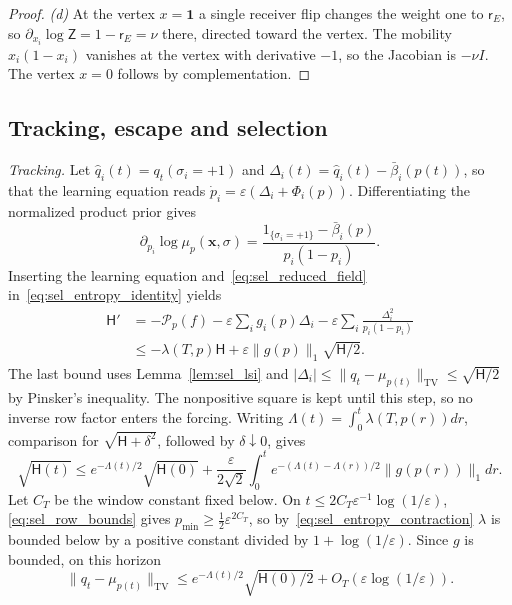\begin{proof}
\emph{(d)} At the vertex $x=\mathbf1$ a single receiver flip changes the weight one to $\mathsf r_E$, so $\partial_{x_i}\log\mathsf Z=1-\mathsf r_E=\nu$ there, directed toward the vertex. The mobility $x_i(1-x_i)$ vanishes at the vertex with derivative $-1$, so the Jacobian is $-\nu I$. The vertex $x=0$ follows by complementation.
\end{proof}

\subsection{Tracking, escape and selection}\label{app:sel_selection}

\emph{Tracking.} Let $\hat q_i(t)=q_t(\sigma_i=+1)$ and $\Delta_i(t)=\hat q_i(t)-\bar\beta_i(p(t))$, so that the learning equation reads $\dot p_i=\varepsilon(\Delta_i+\Phi_i(p))$. Differentiating the normalized product prior gives
\[
\partial_{p_i}\log\mu_p(\mathbf x,\sigma)=\frac{1_{\{\sigma_i=+1\}}-\bar\beta_i(p)}{p_i(1-p_i)}.
\]
Inserting the learning equation and~\eqref{eq:sel_reduced_field} in~\eqref{eq:sel_entropy_identity} yields
\begin{equation}
\begin{aligned}
\mathsf H'&=-\mathcal P_p(f)-\varepsilon\sum_ig_i(p)\Delta_i-\varepsilon\sum_i\frac{\Delta_i^2}{p_i(1-p_i)}\\
&\le-\lambda(T,p)\mathsf H+\varepsilon\|g(p)\|_1\sqrt{\mathsf H/2}.
\end{aligned}
\label{eq:sel_learning_entropy}
\end{equation}
The last bound uses Lemma~\ref{lem:sel_lsi} and $|\Delta_i|\le\|q_t-\mu_{p(t)}\|_{\mathrm{TV}}\le\sqrt{\mathsf H/2}$ by Pinsker's inequality. The nonpositive square is kept until this step, so no inverse row factor enters the forcing. Writing $\Lambda(t)=\int_0^t\lambda(T,p(r))dr$, comparison for $\sqrt{\mathsf H+\delta^2}$, followed by $\delta\downarrow0$, gives
\begin{equation}
\sqrt{\mathsf H(t)}\le e^{-\Lambda(t)/2}\sqrt{\mathsf H(0)}+\frac\varepsilon{2\sqrt2}\int_0^te^{-(\Lambda(t)-\Lambda(r))/2}\|g(p(r))\|_1dr.
\label{eq:sel_tracking}
\end{equation}
Let $C_T$ be the window constant fixed below. On $t\le2C_T\varepsilon^{-1}\log(1/\varepsilon)$, \eqref{eq:sel_row_bounds} gives $p_{\min}\ge\frac12\varepsilon^{2C_T}$, so by~\eqref{eq:sel_entropy_contraction} $\lambda$ is bounded below by a positive constant divided by $1+\log(1/\varepsilon)$. Since $g$ is bounded, on this horizon
\begin{equation}
\|q_t-\mu_{p(t)}\|_{\mathrm{TV}}\le e^{-\Lambda(t)/2}\sqrt{\mathsf H(0)/2}+O_T(\varepsilon\log(1/\varepsilon)).
\label{eq:sel_global_tracking}
\end{equation}
